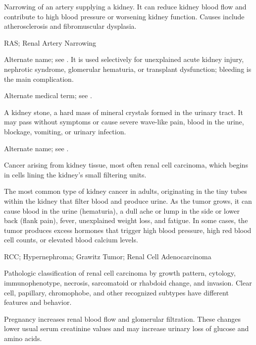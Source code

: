  Narrowing of an artery supplying a kidney. It can reduce kidney blood flow and contribute to high blood pressure or worsening kidney function. Causes include atherosclerosis and fibromuscular dysplasia.

\synonyms
RAS; Renal Artery Narrowing

 Alternate name; see . It is used selectively for unexplained acute kidney injury, nephrotic syndrome, glomerular hematuria, or transplant dysfunction; bleeding is the main complication.

 Alternate medical term; see .

 A kidney stone, a hard mass of mineral crystals formed in the urinary tract. It may pass without symptoms or cause severe wave-like pain, blood in the urine, blockage, vomiting, or urinary infection.

 Alternate name; see .

 Cancer arising from kidney tissue, most often renal cell carcinoma, which begins in cells lining the kidney's small filtering units.

 The most common type of kidney cancer in adults, originating in the tiny tubes within the kidney that filter blood and produce urine. As the tumor grows, it can cause blood in the urine (hematuria), a dull ache or lump in the side or lower back (flank pain), fever, unexplained weight loss, and fatigue. In some cases, the tumor produces excess hormones that trigger high blood pressure, high red blood cell counts, or elevated blood calcium levels.


\synonyms
RCC; Hypernephroma; Grawitz Tumor; Renal Cell Adenocarcinoma

 Pathologic classification of renal cell carcinoma by growth pattern, cytology, immunophenotype, necrosis, sarcomatoid or rhabdoid change, and invasion. Clear cell, papillary, chromophobe, and other recognized subtypes have different features and behavior.

 Pregnancy increases renal blood flow and glomerular filtration. These changes lower
usual serum creatinine values and may increase urinary loss of glucose and amino acids.

